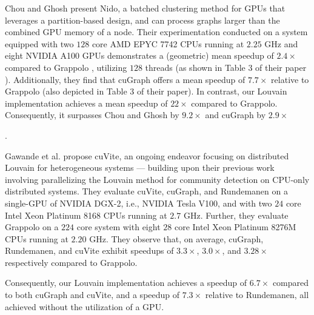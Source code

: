 Chou and Ghosh \cite{chou2022batched} present Nido, a batched clustering method for GPUs that leverages a partition-based design, and can process graphs larger than the combined GPU memory of a node. Their experimentation conducted on a system equipped with two $128$ core AMD EPYC 7742 CPUs running at $2.25$ GHz and eight NVIDIA A100 GPUs demonstrates a (geometric) mean speedup of $2.4\times$ compared to Grappolo \cite{com-halappanavar17}, utilizing $128$ threads (as shown in Table 3 of their paper \cite{chou2022batched}). Additionally, they find that cuGraph \cite{hricik2020using} offers a mean speedup of $7.7\times$ relative to Grappolo (also depicted in Table 3 of their paper). In contrast, our Louvain implementation achieves a mean speedup of $22\times$ compared to Grappolo. Consequently, it surpasses Chou and Ghosh by $9.2\times$ and cuGraph by $2.9\times$.


Gawande et al. \cite{com-gawande22} propose cuVite, an ongoing endeavor focusing on distributed Louvain for heterogeneous systems --- building upon their previous work involving parallelizing the Louvain method for community detection on CPU-only distributed systems. They evaluate cuVite, cuGraph, and Rundemanen on a single-GPU of NVIDIA DGX-2, i.e., NVIDIA Tesla V100, and with two $24$ core Intel Xeon Platinum 8168 CPUs running at $2.7$ GHz. Further, they evaluate Grappolo on a $224$ core system with eight $28$ core Intel Xeon Platinum 8276M CPUs running at $2.20$ GHz. They observe that, on average, cuGraph, Rundemanen, and cuVite exhibit speedups of $3.3\times$, $3.0\times$, and $3.28\times$ respectively compared to Grappolo.  Consequently, our Louvain implementation achieves a speedup of $6.7\times$ compared to both cuGraph and cuVite, and a speedup of $7.3\times$ relative to Rundemanen, all achieved without the utilization of a GPU.
